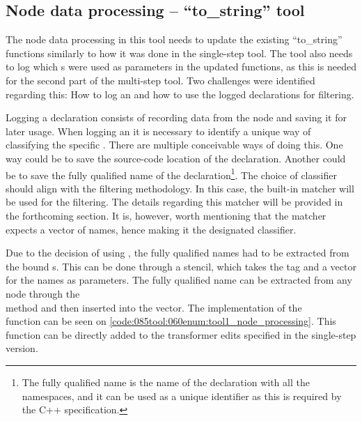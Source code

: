 \subsection{Node data processing -- ``to\_string'' tool}
The node data processing in this tool needs to update the existing ``to\_string'' functions similarly to how it was done in the single-step tool.
The tool also needs to log which s were used as parameters in the updated functions, as this is needed for the second part of the multi-step tool.
Two challenges were identified regarding this: How to log an  and how to use the logged declarations for filtering.

Logging a declaration consists of recording data from the node and saving it for later usage.
When logging an  it is necessary to identify a unique way of classifying the specific . There are multiple conceivable ways of doing this.
One way could be to save the source-code location of the declaration. Another could be to save the fully qualified name of the declaration\footnote{The fully qualified name is the name of the declaration with all the namespaces, and it can be used as a unique identifier as this is required by the C++ specification.}.
The choice of classifier should align with the filtering methodology. In this case, the built-in matcher  will be used for the filtering. The details regarding this matcher will be provided in the forthcoming section.
It is, however, worth mentioning that the  matcher expects a vector of names, hence making it the designated classifier.

Due to the decision of using , the fully qualified names had to be extracted from the bound s.
This can be done through a stencil, which takes the tag and a vector for the names as parameters.
The fully qualified name can be extracted from any  node through the \\
 method and then inserted into the vector. 
The implementation of the \\ function can be seen on \cref{code:085tool:060enum:tool1_node_processing}. This function can be directly added to the transformer edits specified in the single-step version.

